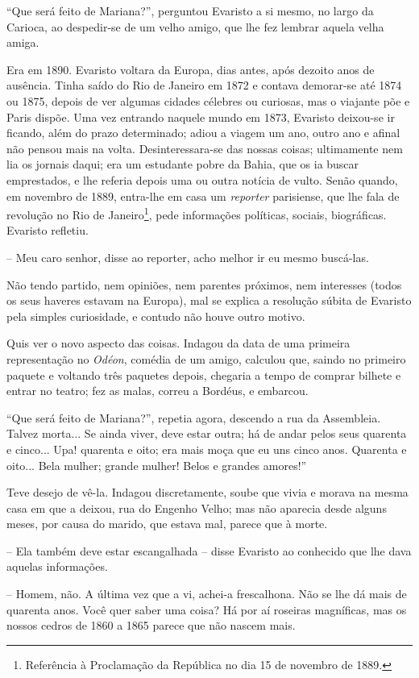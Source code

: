 ``Que será feito de Mariana?'', perguntou Evaristo a si mesmo, no largo
da Carioca, ao despedir-se de um velho amigo, que lhe fez lembrar aquela
velha amiga.

Era em 1890. Evaristo voltara da Europa, dias antes, após dezoito anos
de ausência. Tinha saído do Rio de Janeiro em 1872 e contava demorar-se
até 1874 ou 1875, depois de ver algumas cidades célebres ou curiosas,
mas o viajante põe e Paris dispõe. Uma vez entrando naquele mundo em
1873, Evaristo deixou-se ir ficando, além do prazo determinado; adiou a
viagem um ano, outro ano e afinal não pensou mais na volta.
Desinteressara-se das nossas coisas; ultimamente nem lia os jornais
daqui; era um estudante pobre da Bahia, que os ia buscar emprestados, e
lhe referia depois uma ou outra notícia de vulto. Senão quando, em
novembro de 1889, entra-lhe em casa um \emph{reporter} parisiense, que
lhe fala de revolução no Rio de Janeiro\footnote{Referência à
  Proclamação da República no dia 15 de novembro de 1889.}, pede
informações políticas, sociais, biográficas. Evaristo refletiu.

-- Meu caro senhor, disse ao reporter, acho melhor ir eu mesmo
buscá-las.

Não tendo partido, nem opiniões, nem parentes próximos, nem interesses
(todos os seus haveres estavam na Europa), mal se explica a resolução
súbita de Evaristo pela simples curiosidade, e contudo não houve outro
motivo.

Quis ver o novo aspecto das coisas. Indagou da data de uma primeira
representação no \emph{Odéon}, comédia de um amigo, calculou que, saindo
no primeiro paquete e voltando três paquetes depois, chegaria a tempo de
comprar bilhete e entrar no teatro; fez as malas, correu a Bordéus, e
embarcou.

``Que será feito de Mariana?'', repetia agora, descendo a rua da
Assembleia. Talvez morta... Se ainda viver, deve estar outra; há de
andar pelos seus quarenta e cinco... Upa! quarenta e oito; era mais moça
que eu uns cinco anos. Quarenta e oito... Bela mulher; grande mulher!
Belos e grandes amores!''

Teve desejo de vê-la. Indagou discretamente, soube que vivia e morava na
mesma casa em que a deixou, rua do Engenho Velho; mas não aparecia desde
alguns meses, por causa do marido, que estava mal, parece que à morte.

-- Ela também deve estar escangalhada -- disse Evaristo ao conhecido que
lhe dava aquelas informações.

-- Homem, não. A última vez que a vi, achei-a frescalhona. Não se lhe dá
mais de quarenta anos. Você quer saber uma coisa? Há por aí roseiras
magníficas, mas os nossos cedros de 1860 a 1865 parece que não nascem
mais.

